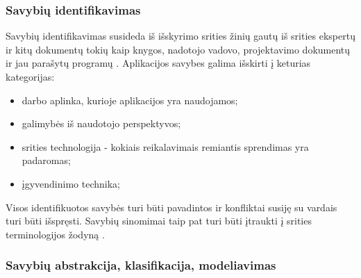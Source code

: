 \documentclass{VUMIFPSkursinis}
\begin{document}
\subsubsection{Savybių identifikavimas} \label{identifikavimas}

Savybių identifikavimas susideda iš išskyrimo srities žinių gautų iš srities ekspertų ir kitų dokumentų tokių kaip knygos, nadotojo vadovo, projektavimo dokumentų ir jau parašytų programų \cite{Lee2015}. Aplikacijos savybes galima išskirti į keturias kategorijas:
\begin{itemize}
\item darbo aplinka, kurioje aplikacijos yra naudojamos;
\item galimybės iš naudotojo perspektyvos;
\item srities technologija - kokiais reikalavimais remiantis sprendimas yra padaromas;
\item įgyvendinimo technika;
\end{itemize}




Visos identifikuotos savybės turi būti pavadintos ir konfliktai susiję su vardais turi būti išspręsti. Savybių sinomimai taip pat turi būti įtraukti į srities terminologijos žodyną \cite{Kang1990}.

\subsubsection{Savybių abstrakcija, klasifikacija, modeliavimas}
\end{document}
